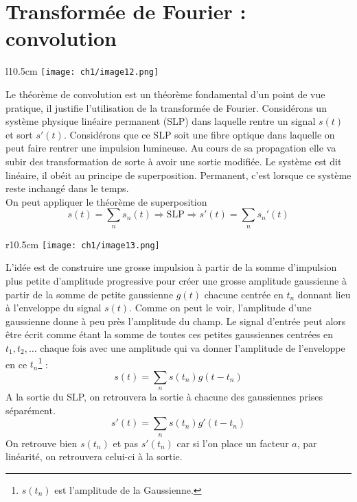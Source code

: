 \newpage
\section{Transformée de Fourier : convolution}
\begin{wrapfigure}[9]{l}{10.5cm}
\vspace{-6mm}
\texttt{[image: ch1/image12.png]}
\end{wrapfigure}
Le théorème de convolution est un théorème fondamental d'un point de vue pratique, il 
justifie l'utilisation de la transformée de Fourier. Considérons un système physique 
linéaire permanent (SLP) dans laquelle rentre un signal $s(t)$ et sort $s'(t)$. Considérons 
que ce SLP soit une fibre optique dans laquelle on peut faire rentrer une impulsion lumineuse. 
Au cours de sa propagation elle va subir des transformation de sorte à avoir une sortie modifiée.
Le système est dit linéaire, il obéit au principe de superposition. Permanent, c'est lorsque 
ce système reste inchangé dans le temps. \\

On peut appliquer le théorème de superposition
\begin{equation}
s(t) = \sum_n s_n(t) \Longrightarrow \text{SLP} \Longrightarrow s'(t) = \sum_n s_n'(t)
\end{equation}

\begin{wrapfigure}[7]{r}{10.5cm}
\vspace{-6mm}
\texttt{[image: ch1/image13.png]}
\end{wrapfigure}
L'idée est de construire une grosse impulsion à partir de la somme d'impulsion plus petite d'amplitude 
progressive pour créer une grosse amplitude gaussienne à partir de la somme de petite gaussienne 
$g(t)$ chacune centrée en $t_n$ donnant lieu à l'enveloppe du signal $s(t)$. Comme on peut le voir, 
l'amplitude d'une gaussienne donne à peu près l'amplitude du champ. Le signal d'entrée peut alors 
être écrit comme étant la somme de toutes ces petites gaussiennes centrées en $t_1,t_2,\dots$ chaque 
fois avec une amplitude qui va donner l'amplitude de l'enveloppe en ce $t_n$\footnote{$s(t_n)$ est 
l'amplitude de la Gaussienne.} :
\begin{equation}
s(t) = \sum_n s(t_n)g(t-t_n)
\end{equation}
A la sortie du SLP, on retrouvera la sortie à chacune des gaussiennes prises séparément.
\begin{equation}
s'(t) = \sum_n s(t_n)g'(t-t_n)
\end{equation}
\danger On retrouve bien $s(t_n)$ et pas $s'(t_n)$ car si l'on place un facteur $a$, par linéarité, 
on retrouvera celui-ci à la sortie.\\

